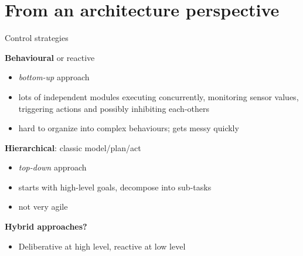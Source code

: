 \documentclass[compress]{beamer}
\begin{document}
\section{From an architecture perspective}

\begin{frame}[label=ctrlstrategies]{Control strategies}

    {\bf Behavioural} or reactive

    \begin{itemize}
        \item \emph{bottom-up} approach
        \item lots of independent modules executing concurrently,
            monitoring sensor values, triggering actions and possibly inhibiting each-others
        \item hard to organize into complex behaviours; gets messy quickly
    \end{itemize}

    \pause

    {\bf Hierarchical}: classic model/plan/act

    \begin{itemize}
        \item \emph{top-down} approach
        \item starts with high-level goals, decompose into sub-tasks
        \item not very agile
    \end{itemize}

    \pause

    {\bf Hybrid approaches?}

    \begin{itemize}
        \item Deliberative at high level, reactive at low level
    \end{itemize}

\end{frame}
\end{document}
